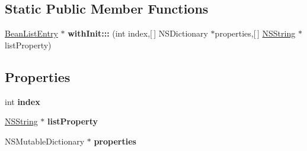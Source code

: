 \subsection*{\-Static \-Public \-Member \-Functions}
\begin{DoxyCompactItemize}
\item 
\hypertarget{interface_bean_list_entry_a7c275f6e1768e590cf018cc4478019f8}{
\hyperlink{interface_bean_list_entry}{\-Bean\-List\-Entry} $\ast$ {\bfseries with\-Init\-:::} (int index,\mbox{[}$\,$\mbox{]} \-N\-S\-Dictionary $\ast$properties,\mbox{[}$\,$\mbox{]} \hyperlink{class_n_s_string}{\-N\-S\-String} $\ast$list\-Property)}
\label{interface_bean_list_entry_a7c275f6e1768e590cf018cc4478019f8}

\end{DoxyCompactItemize}
\subsection*{\-Properties}
\begin{DoxyCompactItemize}
\item 
\hypertarget{interface_bean_list_entry_ae76e624597168e613d1ebd3cd5f80b70}{
int {\bfseries index}}
\label{interface_bean_list_entry_ae76e624597168e613d1ebd3cd5f80b70}

\item 
\hypertarget{interface_bean_list_entry_a720e55cdf8ee2d92ba676ff6af374ce5}{
\hyperlink{class_n_s_string}{\-N\-S\-String} $\ast$ {\bfseries list\-Property}}
\label{interface_bean_list_entry_a720e55cdf8ee2d92ba676ff6af374ce5}

\item 
\hypertarget{interface_bean_list_entry_ae7c542cab9a4e914550b063f70afd434}{
\-N\-S\-Mutable\-Dictionary $\ast$ {\bfseries properties}}
\label{interface_bean_list_entry_ae7c542cab9a4e914550b063f70afd434}

\end{DoxyCompactItemize}


